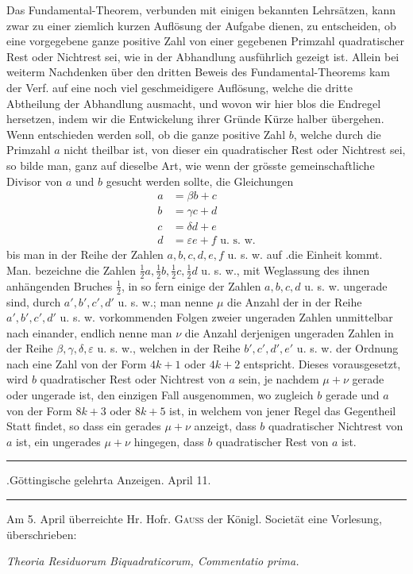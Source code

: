 %
Das Fundamental-Theorem, verbunden mit einigen bekannten Lehrsätzen, kann zwar zu einer ziemlich kurzen Auflösung der Aufgabe dienen, zu entscheiden, ob eine vorgegebene ganze positive Zahl von einer gegebenen Primzahl quadratischer Rest oder Nichtrest sei, wie in der Abhandlung ausführlich gezeigt ist. Allein bei weiterm Nachdenken über den dritten Beweis des Fundamental-Theorems kam der Verf. auf eine noch viel geschmeidigere Auflösung, welche die dritte Abtheilung der Abhandlung ausmacht, und wovon wir hier blos die Endregel hersetzen, indem wir die Entwickelung ihrer Gründe Kürze halber übergehen. Wenn entschieden werden soll, ob die ganze positive Zahl $b$, welche durch die Primzahl $a$ nicht theilbar ist, von dieser ein quadratischer Rest oder Nichtrest sei, so bilde man, ganz auf dieselbe Art, wie wenn der grösste gemeinschaftliche Divisor von $a$ und $b$ gesucht werden sollte, die Gleichungen
\[
\begin{aligned}
a&=\beta b+c\\
b&=\gamma c+d\\
c&=\delta d+e\\
d&=\varepsilon e+f\text{ u. s. w.}
\end{aligned}
\]
bis man in der Reihe der Zahlen $a,b,c,d,e,f$ u. s. w. auf .die Einheit kommt. Man. bezeichne die Zahlen $\frac12a,\frac12b,\frac12c,\frac12d$ u. s. w., mit Weglassung des ihnen anhängenden Bruches $\frac12$, in so fern einige der Zahlen $a,b,c,d$ u. s. w. ungerade sind, durch $a',b',c',d'$ u. s. w.; man nenne $\mu$ die Anzahl der in der Reihe $a',b',c',d'$ u. s. w. vorkommenden Folgen zweier ungeraden Zahlen unmittelbar nach einander, endlich nenne man $\nu$ die Anzahl derjenigen ungeraden Zahlen in der Reihe $\beta,\gamma,\delta,\varepsilon$ u. s. w., welchen in der Reihe $b',c',d',e'$ u. s. w. der Ordnung nach eine Zahl von der Form $4k+1$ oder $4k+2$ entspricht. Dieses vorausgesetzt, wird $b$ quadratischer Rest oder Nichtrest von $a$ sein, je nachdem $\mu+\nu$ gerade oder ungerade ist, den einzigen Fall ausgenommen, wo zugleich $b$ gerade und $a$ von der Form $8k+3$ oder $8k+5$ ist, in welchem von jener Regel das Gegentheil Statt findet, so dass ein gerades $\mu+\nu$ anzeigt, dass $b$ quadratischer Nichtrest von $a$ ist, ein ungerades $\mu+\nu$ hingegen, dass $b$ quadratischer Rest von $a$ ist.

\clearpage
{}%
\begin{center}
\rule{.82\linewidth}{.35pt}\par
.Göttingische gelehrta Anzeigen. April 11.\par
\rule{.82\linewidth}{.35pt}
\end{center}
Am 5. April überreichte Hr. Hofr. \textsc{Gauss} der Königl. Societät eine Vorlesung, überschrieben:
\begin{center}\itshape
Theoria Residuorum Biquadraticorum, Commentatio prima.
\end{center}

